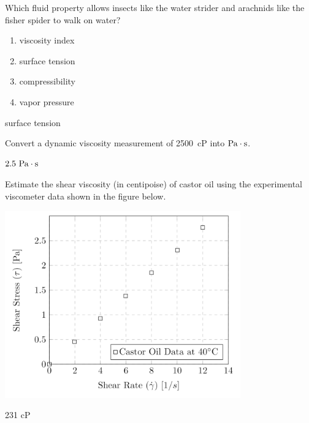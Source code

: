 \documentclass[12pt]{article}
\begin{document}
\begin{question}

Which fluid property allows insects like the water strider and arachnids like the fisher spider to walk on water?

\begin{enumerate}
  \item viscosity index
  \item surface tension
  \item compressibility
  \item vapor pressure
\end{enumerate}

\begin{solution}
surface tension
\end{solution}

\end{question}


\begin{question}
Convert a dynamic viscosity measurement of 2500~cP into $\mathrm{Pa}\cdot \mathrm{s}$.

\begin{solution}
$2.5~\mathrm{Pa}\cdot \mathrm{s}$
\end{solution}
\end{question}


\begin{question}

 Estimate the shear viscosity (in centipoise) of castor oil using the experimental viscometer data shown in the figure below.

 \includegraphics[width=4in]{imgs/CastorOil.png}

\begin{solution}
231 cP
\end{solution}
\end{question}
\end{document}
